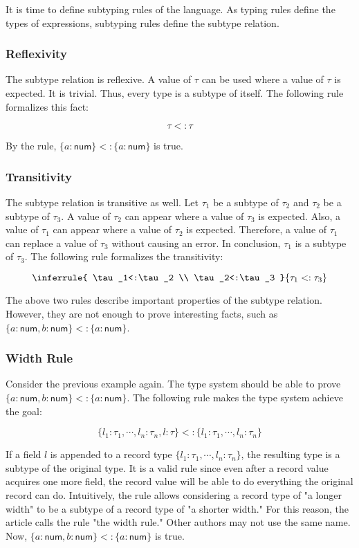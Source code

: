 It is time to define subtyping rules of the language. As typing rules define the
types of expressions, subtyping rules define the subtype relation.

\subsubsection{Reflexivity}

The subtype relation is reflexive. A value of $\tau$ can be used where a value
of $\tau$ is expected. It is trivial. Thus, every type is a subtype of itself.
The following rule formalizes this fact:

\[\tau<:\tau\]

By the rule, $\{a:\textsf{num}\}<:\{a:\textsf{num}\}$ is true.

\subsubsection{Transitivity}

The subtype relation is transitive as well. Let $\tau_1$ be a subtype of
$\tau_2$ and $\tau_2$ be a subtype of $\tau_3$. A value of $\tau_2$ can
appear where a value of $\tau_3$ is expected. Also, a value of $\tau_1$ can
appear where a value of $\tau_2$ is expected. Therefore, a value of $\tau_1$
can replace a value of $\tau_3$ without causing an error. In conclusion,
$\tau_1$ is a subtype of $\tau_3$. The following rule formalizes the
transitivity:

\[
\inferrule
{ \tau_1<:\tau_2 \\ \tau_2<:\tau_3 }
{ \tau_1<:\tau_3 }
\]

The above two rules describe important properties of the subtype relation.
However, they are not enough to prove interesting facts, such as \(\{a:\textsf{
num},b:\textsf{num}\}<:\{a:\textsf{num}\}\).

\subsubsection{Width Rule}

Consider the previous example again. The type system should be able to prove
$\{a:\textsf{num},b:\textsf{num}\}<:\{a:\textsf{num}\}$. The following rule makes the
type system achieve the goal:

\[
\{l_1:\tau_1,\cdots,l_n:\tau_n,l:\tau\}<:\{l_1:\tau_1,\cdots,l_n:\tau_n\}
\]

If a field $l$ is appended to a record type
$\{l_1:\tau_1,\cdots,l_n:\tau_n\}$, the resulting type is a subtype of the
original type. It is a valid rule since even after a record value acquires one
more field, the record value will be able to do everything the original record
can do. Intuitively, the rule allows considering a record type of "a longer
width" to be a subtype of a record type of "a shorter width." For this reason,
the article calls the rule "the width rule." Other authors may not use the same
name. Now, $\{a:\textsf{num},b:\textsf{num}\}<:\{a:\textsf{num}\}$ is true.

